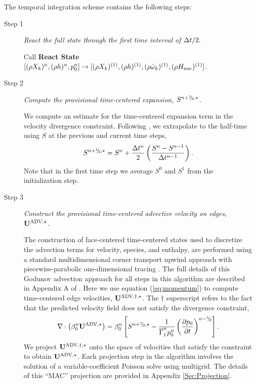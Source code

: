 The temporal integration scheme contains the following steps:
\begin{description}

\item[Step 1] {\em React the full state through the first time interval of $\Delta t / 2.$}

Call {\bf React State}$[(\rho X_k)^n, (\rho h)^n, p_0^n] \rightarrow [(\rho X_k)^{(1)}, (\rho h)^{(1)}, (\rho \dot\omega_k)^{(1)}, (\rho H_{\rm nuc})^{(1)}]$.


\item[Step 2] {\em Compute the provisional time-centered expansion,
    $S^{\nph,\star}$.}

We compute an estimate for the time-centered expansion term in the velocity
divergence constraint.  Following \citet{Bell:2004}, we extrapolate
to the half-time using $S$ at the previous and current
time steps,
\begin{equation}
S^{\nph,\star} = S^n + \frac{\dt^n}{2} \left(\frac{S^n - S^{n-1}}{\dt^{n-1}}\right).
\end{equation}
Note that in the first time step we average $S^0$ and $S^1$ from the
initialization step.

\item[Step 3] {\em Construct the provisional time-centered advective velocity on
edges, ${\bf{U}}^{\mathrm{ADV},\star}$.}

The construction of face-centered time-centered states used to discretize the
advection terms for velocity, species, and enthalpy, are performed using
a standard multidimensional corner transport upwind approach
\citep{colella1990multidimensional,saltzman1994unsplit} with piecewise-parabolic
one-dimensional tracing \citep{colella1984piecewise}.  The full details of this
Godunov advection approach for all steps in this algorithm are described 
in Appendix A of \cite{XRB_III}.
Here we use equation (\ref{eq:momentum}) to compute time-centered edge velocities, ${\bf{U}}^{\mathrm{ADV},\dagger,\star}$.
The $\dagger$ superscript refers to the fact that the predicted velocity field does not satisfy the divergence constraint,
\begin{equation}
\nabla \cdot \left(\beta_0^n \uadvone\right) = \beta_0^n \left[S^{\nph,\star} - \frac{1}{\gammaonebar^np_0^n}\left(\frac{\partial p_0}{\partial t}\right)^{n-\myhalf} \right].\label{eq:div1}
\end{equation}
 We project ${\bf{U}}^{\mathrm{ADV},\dagger,\star}$ onto the space of velocities that satisfy the constraint to obtain ${\bf{U}}^{\mathrm{ADV},\star}$.
Each projection step in the algorithm involves the solution of a variable-coefficient Poisson solve using multigrid.
The details of this ``MAC'' projection are provided in Appendix \ref{Sec:Projection}.


\end{description}
